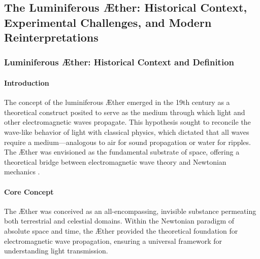 
    \subsection{The Luminiferous Æther: Historical Context, Experimental Challenges, and Modern Reinterpretations}

    \subsubsection*{Luminiferous Æther: Historical Context and Definition}
    \paragraph*{Introduction}
    The concept of the luminiferous Æther emerged in the 19th century as a theoretical construct posited to serve as the medium through which light and other electromagnetic waves propagate. This hypothesis sought to reconcile the wave-like behavior of light with classical physics, which dictated that all waves require a medium—analogous to air for sound propagation or water for ripples. The Æther was envisioned as the fundamental substrate of space, offering a theoretical bridge between electromagnetic wave theory and Newtonian mechanics \cite{young1801, maxwell1865, michelson1887, einstein1905, higgs1964}.

    \paragraph*{Core Concept}
    The Æther was conceived as an all-encompassing, invisible substance permeating both terrestrial and celestial domains. Within the Newtonian paradigm of absolute space and time, the Æther provided the theoretical foundation for electromagnetic wave propagation, ensuring a universal framework for understanding light transmission.

